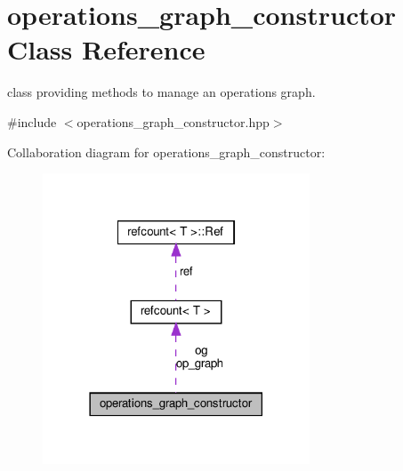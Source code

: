 \hypertarget{classoperations__graph__constructor}{}\section{operations\+\_\+graph\+\_\+constructor Class Reference}
\label{classoperations__graph__constructor}


class providing methods to manage an operations graph.  




{\ttfamily \#include $<$operations\+\_\+graph\+\_\+constructor.\+hpp$>$}



Collaboration diagram for operations\+\_\+graph\+\_\+constructor\+:
\nopagebreak
\begin{figure}[H]
\begin{center}
\leavevmode
\includegraphics[width=225pt]{d9/dbe/classoperations__graph__constructor__coll__graph}
\end{center}
\end{figure}
